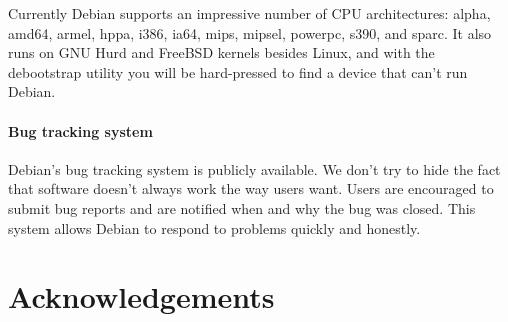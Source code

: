 \documentclass[letterpaper,landscape]{report}
\begin{document}
\begin{multicols}{3}
Currently Debian supports an impressive number of CPU architectures: alpha,
amd64, armel, hppa, i386, ia64, mips, mipsel, powerpc, s390, and sparc. It also
runs on GNU Hurd and FreeBSD kernels besides Linux, and with the debootstrap
utility you will be hard-pressed to find a device that can't run Debian.

\paragraph{Bug tracking system}

Debian's bug tracking system is publicly available. We don't try to hide the
fact that software doesn't always work the way users want. Users are encouraged
to submit bug reports and are notified when and why the bug was closed. This
system allows Debian to respond to problems quickly and honestly.



\section*{Acknowledgements}

\end{multicols}
\end{document}
